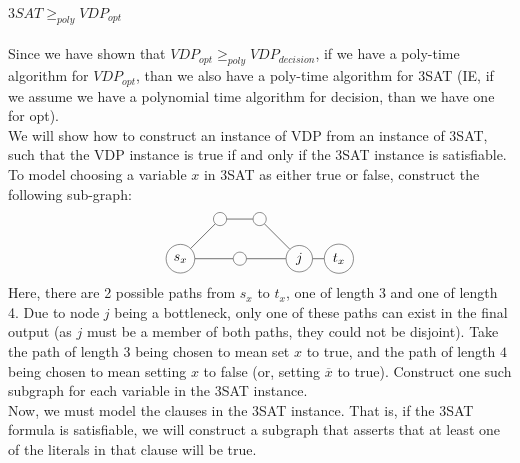 \documentclass[letterpaper,notitlepage,twoside]{article}
\begin{document}
$3SAT \geq _{poly} VDP_{opt}$\\\\
Since we have shown that $VDP_{opt} \geq _{poly} VDP_{decision}$, if we have a poly-time algorithm for $VDP_{opt}$, than we also have a poly-time algorithm for 3SAT (IE, if we assume we have a polynomial time algorithm for decision, than we have one for opt). \\
We will show how to construct an instance of VDP from an instance of 3SAT, such that the VDP instance is true if and only if the 3SAT instance is satisfiable. To model choosing a variable $x$ in 3SAT as either true or false, construct the following sub-graph: \\
$$\begin{tikzpicture}
    \node[circle,draw=black!80] (a) at (0, 1) {$s_x$};
    \node[circle,draw=black!80] (b) at (1, 2) {};
    \node[circle,draw=black!80] (c) at (2, 2) {};
    \node[circle,draw=black!80] (d) at (1.5, 1) {};
    \node[circle,draw=black!80] (e) at (3, 1) {$j$};
    \node[circle,draw=black!80] (f) at (4, 1) {$t_x$};
    \draw (a) -- (b) -- (c) -- (e) -- (f);
    \draw (a) -- (d) -- (e);
\end{tikzpicture}$$
Here, there are 2 possible paths from $s_x$ to $t_x$, one of length 3 and one of length 4. Due to node $j$ being a bottleneck, only one of these paths can exist in the final output (as $j$ must be a member of both paths, they could not be disjoint). Take the path of length 3 being chosen to mean set $x$ to true, and the path of length $4$ being chosen to mean setting $x$ to false (or, setting $\overline x$ to true). Construct one such subgraph for each variable in the 3SAT instance. \\
Now, we must model the clauses in the 3SAT instance. That is, if the 3SAT formula is satisfiable, we will construct a subgraph that asserts that at least one of the literals in that clause will be true. 
\end{document}
